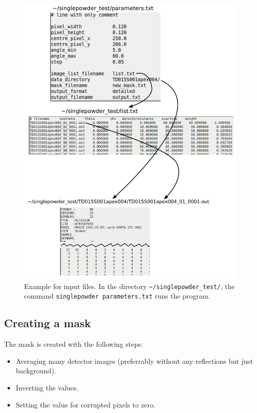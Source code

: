 \documentclass[a4paper, 12pt, twoside]{scrartcl}
\begin{document}
\begin{figure}
\includegraphics[width=15cm]{figs/files.pdf}
\caption{\label{fig:files}Example for input files. In the directory \texttt{\~{}/singlepowder\_test/}, the command \texttt{singlepowder parameters.txt} runs the program.}
\end{figure}

\subsection{Creating a mask}

The mask is created with the following steps:
\begin{itemize}
\item Averaging many detector images (preferrably without any reflections but just background).
\item Inverting the values.
\item Setting the value for corrupted pixels to zero.
\end{itemize}
\end{document}
